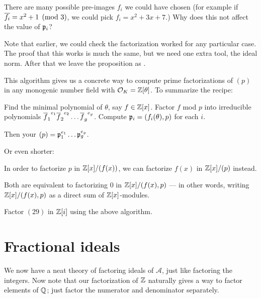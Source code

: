 \begin{ques}
	There are many possible pre-images $f_i$ we could have chosen
	(for example if $\overline{f_i} = x^2+1 \pmod 3$, we could pick $f_i = x^2 + 3x + 7$.)
	Why does this not affect the value of $\mathfrak p_i$?
\end{ques}

Note that earlier, we could check the factorization worked
for any particular case.
The proof that this works is much the same, but we need one extra tool, the ideal norm.
After that we leave the proposition as .

This algorithm gives us a concrete way to compute prime factorizations of $(p)$
in any monogenic number field with $\mathcal O_K = \mathbb Z[\theta]$. To summarize the recipe:
\begin{enumerate}
	\ii Find the minimal polynomial of $\theta$, say $f \in \mathbb Z[x]$.
	\ii Factor $f$ mod $p$ into irreducible polynomials
	${\overline f_1}^{e_1} {\overline f_2}^{e_2} \dots {\overline f_g}^{e_g}$.
	\ii Compute $\mathfrak p_i = (f_i(\theta), p)$ for each $i$.
\end{enumerate}
Then your $(p) = \mathfrak p_1^{e_1} \dots \mathfrak p_g^{e_g}$.

Or even shorter:
\begin{moral}
	In order to factorize $p$ in $\mathbb Z[x]/(f(x))$, we can factorize $f(x)$ in $\mathbb Z[x]/(p)$ instead.
\end{moral}
Both are equivalent to factorizing $0$ in $\mathbb Z[x]/(f(x), p)$ --- in other words, writing
$\mathbb Z[x]/(f(x), p)$ as a direct sum of $\mathbb Z[x]$-modules.

\begin{exercise}
	Factor $(29)$ in $\mathbb Z[i]$ using the above algorithm.
\end{exercise}


\section{Fractional ideals}
We now have a neat theory of factoring ideals of $\mathcal A$,
just like factoring the integers.
Now note that our factorization of $\mathbb Z$ naturally gives a way to factor
elements of $\mathbb Q$; just factor the numerator and denominator separately.

